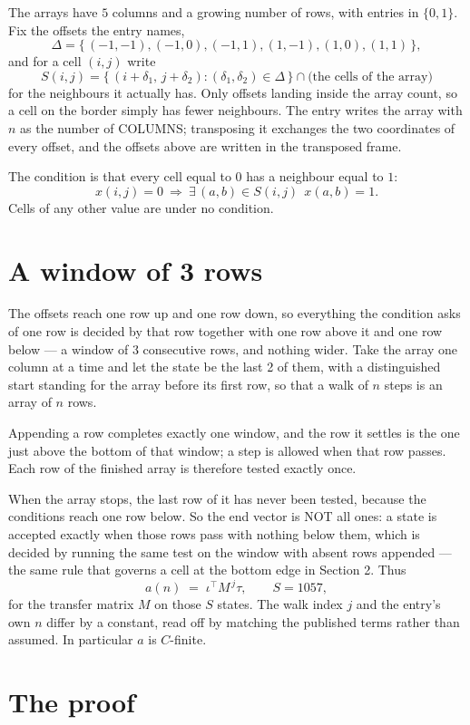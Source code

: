 \documentclass[11pt,a4paper]{article}
\theoremstyle{plain}
\theoremstyle{definition}
\begin{document}
The arrays have $5$ columns and a growing number of rows, with entries in $\{0,1\}$. Fix the
offsets the entry names,
\[
\Delta=\{\,(-1,-1), (-1,0), (-1,1), (1,-1), (1,0), (1,1)\,\},
\]
and for a cell $(i,j)$ write
\[
S(i,j)=\{\,(i+\delta_1,\,j+\delta_2) : (\delta_1,\delta_2)\in\Delta\,\}\cap
\text{(the cells of the array)}
\]
for the neighbours it actually has. Only offsets landing inside the array count, so a cell on
the border simply has fewer neighbours. The entry writes the array with $n$ as the number of COLUMNS; transposing it exchanges the two coordinates of every offset, and the offsets above are written in the transposed frame.

The condition is that every cell equal to $0$ has a neighbour equal to $1$:
\[
x(i,j)=0\ \Longrightarrow\ \exists\,(a,b)\in S(i,j)\ \ x(a,b)=1 .
\]
Cells of any other value are under no condition.

\section{A window of 3 rows}

The offsets reach one row up and one row down, so everything the condition asks of one row is
decided by that row together with one row above it and one row below --- a window of
$3$ consecutive rows, and nothing wider. Take the array one column at a time and
let the state be the last 2 of them, with a distinguished start standing for the array before its
first row, so that a walk of $n$ steps is an array of $n$ rows.

Appending a row completes exactly one window, and the row it settles is the one just above the bottom of that window; a step is
allowed when that row passes. Each row of the finished array is therefore tested exactly once.

When the array stops, the last row of it has never been tested, because the
conditions reach one row below. So the end vector is NOT all ones: a state is accepted exactly when
those rows pass with nothing below them, which is decided by running the same test on the window
with absent rows appended --- the same rule that governs a cell at the bottom edge in
Section 2.
Thus
\[
a(n)\;=\;\iota^{\!\top}M^{\,j}\tau ,\qquad S=1057,
\]
for the transfer matrix $M$ on those $S$ states. The walk index $j$ and the entry's own $n$
differ by a constant, read off by matching the published terms rather than assumed. In
particular $a$ is $C$-finite.

\section{The proof}
\end{document}
